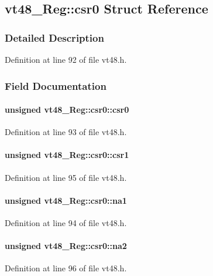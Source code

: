 \subsection{vt48\_\-Reg::csr0 Struct Reference}
\label{structvt48__Reg_1_1csr0}


\subsubsection{Detailed Description}


Definition at line 92 of file vt48.h.

\subsubsection{Field Documentation}
\paragraph[{csr0}]{\setlength{\rightskip}{0pt plus 5cm}unsigned {\bf vt48\_\-Reg::csr0::csr0}}\hfill\label{structvt48__Reg_1_1csr0_a34cb2bcb9d2ddb209a30a311639f393c}


Definition at line 93 of file vt48.h.
\paragraph[{csr1}]{\setlength{\rightskip}{0pt plus 5cm}unsigned {\bf vt48\_\-Reg::csr0::csr1}}\hfill\label{structvt48__Reg_1_1csr0_a2c42c434e643693f3e70caeab79a3734}


Definition at line 95 of file vt48.h.
\paragraph[{na1}]{\setlength{\rightskip}{0pt plus 5cm}unsigned {\bf vt48\_\-Reg::csr0::na1}}\hfill\label{structvt48__Reg_1_1csr0_a259d46f844656ec4b2cf890774bb7c89}


Definition at line 94 of file vt48.h.
\paragraph[{na2}]{\setlength{\rightskip}{0pt plus 5cm}unsigned {\bf vt48\_\-Reg::csr0::na2}}\hfill\label{structvt48__Reg_1_1csr0_a8a0edf2d2b06530c8ad03151f69aa556}


Definition at line 96 of file vt48.h.